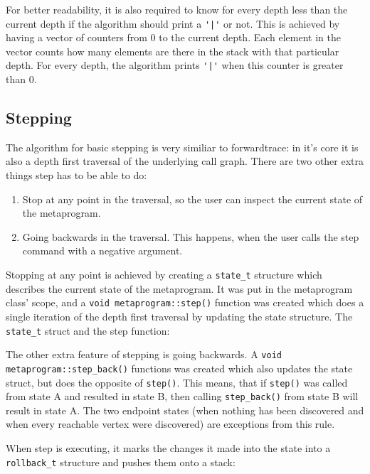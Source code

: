 For better readability, it is also required to know for every depth less than
the current depth if the algorithm should print a \verb$'|'$ or not. This
is achieved by having a vector of counters from 0 to the current depth. Each
element in the vector counts how many elements are there in the stack with that
particular depth. For every depth, the algorithm prints \verb$'|'$ when
this counter is greater than 0.

\subsection{Stepping}

The algorithm for basic stepping is very similiar to forwardtrace: in it's core
it is also a depth first traversal of the underlying call graph. There are two
other extra things step has to be able to do:

\begin{enumerate}
    \item
        Stop at any point in the traversal, so the user can inspect the current
        state of the metaprogram.
    \item
        Going backwards in the traversal. This happens, when the user calls the
        step command with a negative argument.
\end{enumerate}

Stopping at any point is achieved by creating a \verb$state_t$ structure
which describes the current state of the metaprogram. It was put in the
metaprogram class' scope, and a \verb$void metaprogram::step()$ function
was created which does a single iteration of the depth first traversal by
updating the state structure. The \verb$state_t$ struct and the step
function:


The other extra feature of stepping is going backwards. A
\verb$void metaprogram::step_back()$ functions was created which also
updates the state struct, but does the opposite of \verb$step()$. This
means, that if \verb$step()$ was called from state A and resulted in state
B, then calling \verb$step_back()$ from state B will result in state A.
The two endpoint states (when nothing has been discovered and when every
reachable vertex were discovered) are exceptions from this rule.

When step is executing, it marks the changes it made into the state into a
\verb$rollback_t$ structure and pushes them onto a stack:


